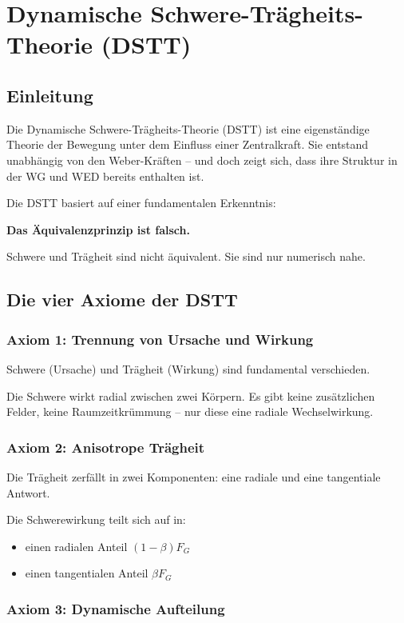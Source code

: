 \chapter{Dynamische Schwere-Trägheits-Theorie (DSTT)}

\section{Einleitung}

Die Dynamische Schwere-Trägheits-Theorie (DSTT) ist eine eigenständige Theorie der Bewegung unter dem Einfluss einer Zentralkraft. Sie entstand unabhängig von den Weber-Kräften – und doch zeigt sich, dass ihre Struktur in der WG und WED bereits enthalten ist.

Die DSTT basiert auf einer fundamentalen Erkenntnis:

\textbf{Das Äquivalenzprinzip ist falsch.}

Schwere und Trägheit sind nicht äquivalent. Sie sind nur numerisch nahe.

\section{Die vier Axiome der DSTT}

\subsection{Axiom 1: Trennung von Ursache und Wirkung}

Schwere (Ursache) und Trägheit (Wirkung) sind fundamental verschieden.

Die Schwere wirkt radial zwischen zwei Körpern. Es gibt keine zusätzlichen Felder, keine Raumzeitkrümmung – nur diese eine radiale Wechselwirkung.

\subsection{Axiom 2: Anisotrope Trägheit}

Die Trägheit zerfällt in zwei Komponenten: eine radiale und eine tangentiale Antwort.

Die Schwerewirkung teilt sich auf in:
\begin{itemize}
\item einen radialen Anteil \( (1-\beta) F_G \)
\item einen tangentialen Anteil \( \beta F_G \)
\end{itemize}

\subsection{Axiom 3: Dynamische Aufteilung}

